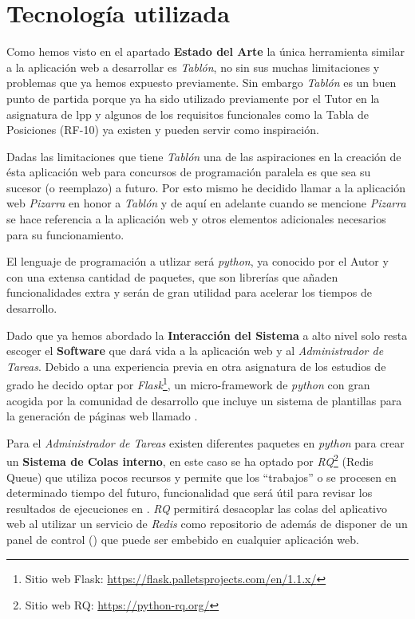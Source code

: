 \documentclass[11pt,spanish,listoffigures,listoftables]{tfgetsinf}
\begin{document}
\section{Tecnología utilizada}

Como hemos visto en el apartado \textbf{Estado del Arte} la única herramienta similar a la aplicación web a desarrollar es \textit{Tablón}, no sin sus muchas limitaciones y problemas que ya hemos expuesto previamente. Sin embargo \textit{Tablón} es un buen punto de partida porque ya ha sido utilizado previamente por el Tutor en la asignatura de \acrshort{lpp} y algunos de los requisitos funcionales como la Tabla de Posiciones (RF-10) ya existen y pueden servir como inspiración.

Dadas las limitaciones que tiene \textit{Tablón} una de las aspiraciones en la creación de ésta aplicación web para concursos de programación paralela es que sea su sucesor (o reemplazo) a futuro. Por esto mismo he decidido llamar a la aplicación web \textit{Pizarra} en honor a \textit{Tablón} y de aquí en adelante cuando se mencione \textit{Pizarra} se hace referencia a la aplicación web y otros elementos adicionales necesarios para su funcionamiento. 

El lenguaje de programación a utlizar será \textit{python}, ya conocido por el Autor y con una extensa cantidad de \gls{paquete}s, que son librerías que añaden funcionalidades extra y serán de gran utilidad para acelerar los tiempos de desarrollo. 

Dado que ya hemos abordado la \textbf{Interacción del Sistema} a alto nivel solo resta escoger el \textbf{Software} que dará vida a la aplicación web y al \textit{Administrador de Tareas}. Debido a una experiencia previa en otra asignatura de los estudios de grado he decido optar por \textit{Flask}\footnote{Sitio web Flask: \url{https://flask.palletsprojects.com/en/1.1.x/}}, un micro-framework de \textit{python} con gran acogida por la comunidad de desarrollo que incluye un sistema de plantillas para la generación de páginas web llamado . 

Para el \textit{Administrador de Tareas} existen diferentes \gls{paquete}s en \textit{python} para crear un \textbf{Sistema de Colas interno}, en este caso se ha optado por \textit{RQ}\footnote{Sitio web RQ: \url{https://python-rq.org/}} (Redis Queue) que utiliza pocos recursos y permite que  los ``trabajos'' o  se procesen en determinado tiempo del futuro, funcionalidad que será útil para revisar los resultados de ejecuciones en \kahan. \textit{RQ} permitirá desacoplar las \gls{cola}s del aplicativo web al utilizar un servicio de \textit{Redis} como repositorio de  además de disponer de un panel de control () que puede ser embebido en cualquier aplicación web.
\end{document}
